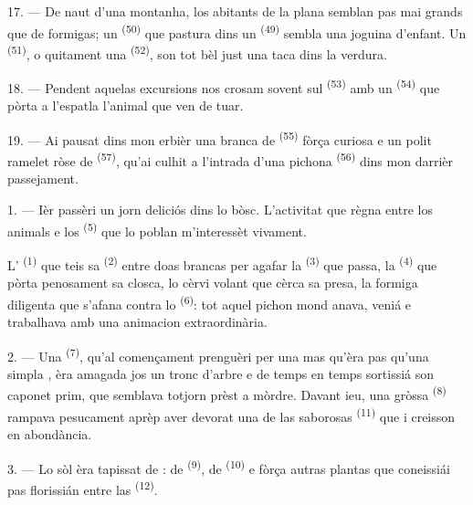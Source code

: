 17. --- De naut d'una montanha, los abitants de la plana semblan pas mai grands
que de formigas; un  \textsuperscript{(50)} que pastura
dins un  \textsuperscript{(49)} sembla una joguina d'enfant. Un
 \textsuperscript{(51)}, o quitament una 
\textsuperscript{(52)}, son tot bèl just una taca dins la verdura.

18. --- Pendent aquelas excursions nos crosam sovent sul 
\textsuperscript{(53)} amb un  \textsuperscript{(54)} que
pòrta a l'espatla l'animal que ven de tuar.

19. --- Ai pausat dins mon erbièr una branca de 
\textsuperscript{(55)} fòrça curiosa e un polit ramelet ròse de 
\textsuperscript{(57)}, qu'ai culhit a l'intrada d'una pichona 
\textsuperscript{(56)} dins mon darrièr passejament.

\VUsaut{3.0mm}
\VUsaut{3.0mm}

\VUsaut{3.0mm}

1. --- Ièr passèri un jorn deliciós dins lo bòsc. L'activitat que règna entre los
animals e los  \textsuperscript{(5)} que lo poblan
m'interessèt vivament.

L' \textsuperscript{(1)} que teis sa 
\textsuperscript{(2)} entre doas brancas per agafar la 
\textsuperscript{(3)} que passa, la  \textsuperscript{(4)}
que pòrta penosament sa closca, lo cèrvi volant que cèrca sa presa, la formiga
diligenta que s'afana contra lo  \textsuperscript{(6)}: tot
aquel pichon mond anava, veniá e trabalhava amb una animacion extraordinària.

2. --- Una  \textsuperscript{(7)}, qu'al començament prenguèri per
una  mas qu'èra pas qu'una simpla , èra amagada
jos un tronc d'arbre e de temps en temps sortissiá son caponet prim, que semblava
totjorn prèst a mòrdre. Davant ieu, una gròssa 
\textsuperscript{(8)} rampava pesucament aprèp aver devorat una de las saborosas
 \textsuperscript{(11)} que i creisson en abondància.

3. --- Lo sòl èra tapissat de : de 
\textsuperscript{(9)}, de  \textsuperscript{(10)} e fòrça
autras plantas que coneissiái pas florissián entre las 
\textsuperscript{(12)}.

